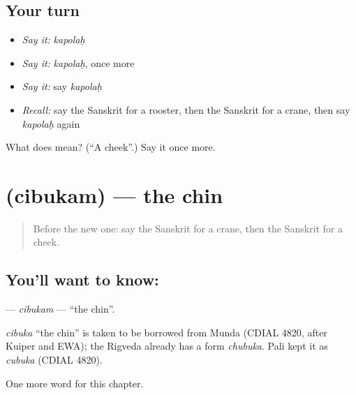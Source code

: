\subsection*{Your turn}
\begin{itemize}
\raggedright
  \item \emph{Say it:} \emph{kapolaḥ}
  \item \emph{Say it:} \emph{kapolaḥ}, once more
  \item \emph{Say it:} say \emph{kapolaḥ}
  \item \emph{Recall:} say the Sanskrit for a rooster, then the Sanskrit for a crane, then say \emph{kapolaḥ} again
\end{itemize}

\begin{tcolorbox}[breakable,colback=teal!4,colframe=teal!35!black,title={Before you move on}]
What does  mean? (\textquotedblleft{}A cheek\textquotedblright{}.) Say it once more.
\end{tcolorbox}
\section[\texorpdfstring{\sk{चिबुकम्} (cibukam)}{चिबुकम् (cibukam)}]{ (cibukam) — the chin}

\label{lesson:SA-C116-cibukam}



\begin{quote}
Before the new one: say the Sanskrit for a crane, then the Sanskrit for a cheek.
\end{quote}

\subsection*{You'll want to know: }
\textbf{} — \emph{cibukam} — \textquotedblleft{}the chin\textquotedblright{}.

\begin{cousinweb}
\emph{cibuka} \textquotedblleft{}the chin\textquotedblright{} is taken to be borrowed from Munda (CDIAL 4820, after Kuiper and EWA); the Rigveda already has a form \emph{chubuka}. Pali kept it as \emph{cubuka} (CDIAL 4820).
\end{cousinweb}

\begin{grammarlens}[title={What you've built}]
One more word for this chapter.
\end{grammarlens}

